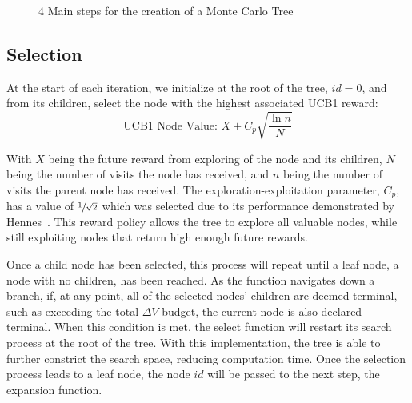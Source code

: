 \documentclass[letterpaper, preprint, paper,11pt]{AAS}	%
\newcommand*\circled[1]{\tikz[baseline=(char.base)]{
            \node[shape=circle,draw,inner sep=0.8pt] (char) {#1};}}
\begin{document}
\begin{figure}[htb]
    \centering
    \caption{4 Main steps for the creation of a Monte Carlo Tree}
    \label{fig:mctsFunc}
\end{figure}

\subsection{Selection}
At the start of each iteration, we initialize at the root of the tree, $id = 0$, and from its children, select the node with the highest associated UCB1 reward:
\begin{equation}
    \label{eq:UCB1}
    \text{UCB1 Node Value: } X + C_p \sqrt{\frac{\ln{n}}{N}}
\end{equation}

With $X$ being the future reward from exploring of the node and its children, $N$ being the number of visits the node has received, and $n$ being the number of visits the parent node has received. The exploration-exploitation parameter, $C_p$, has a value of \(\sfrac{1}{\sqrt{2}}\) which was selected due to its performance demonstrated by Hennes~\cite{Hennes2015}. This reward policy allows the tree to explore all valuable nodes, while still exploiting nodes that return high enough future rewards.

Once a child node has been selected, this process will repeat until a leaf node, a node with no children, has been reached. As the function navigates down a branch, if, at any point, all of the selected nodes' children are deemed terminal, such as exceeding the total $\Delta V$ budget, the current node is also declared terminal. When this condition is met, the select function will restart its search process at the root of the tree. With this implementation, the tree is able to further constrict the search space, reducing computation time. Once the selection process leads to a leaf node, the node $id$ will be passed to the next step, the expansion function.
\end{document}
